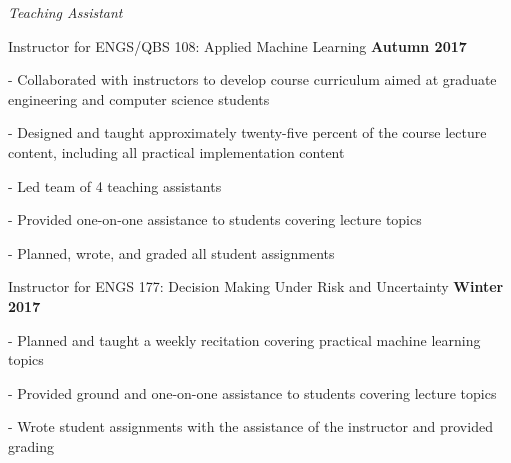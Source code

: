 \documentclass[10pt]{article}
\newcommand{\halfblankline}{\quad\vspace{-0.5\baselineskip}\pagebreak[3]}
\begin{document}
\begin{innerlist}
\item[] \textit{Teaching Assistant}%
    \begin{innerlist}
        \item[] Instructor for ENGS/QBS 108: Applied Machine Learning
            \hfill \textbf{Autumn 2017}
        \begin{innerlist}
            \item[-] Collaborated with instructors to develop course curriculum aimed at graduate engineering and computer science students
            \item[-] Designed and taught approximately twenty-five percent of the course lecture content, including all practical implementation content
            \item[-] Led team of 4 teaching assistants
            \item[-] Provided one-on-one assistance to students covering lecture topics
            \item[-] Planned, wrote, and graded all student assignments
        \end{innerlist}


        \item[] Instructor for ENGS 177: Decision Making Under Risk and Uncertainty
            \hfill \textbf{Winter 2017}
        \begin{innerlist}
            \item[-] Planned and taught a weekly recitation covering practical machine learning topics
            \item[-] Provided ground and one-on-one assistance to students covering lecture topics
            \item[-] Wrote student assignments with the assistance of the instructor and provided grading
        \end{innerlist}

    \end{innerlist}

\end{innerlist}
\end{document}
